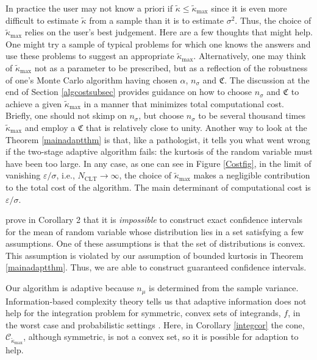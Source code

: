 \documentclass[graybox]{svmult}
\newcommand{\fudge}{\mathfrak{C}}
\newcommand{\tkappa}{\tilde{\kappa}}
\newcommand{\cc}{\mathcal{C}}
\begin{document}
In practice the user may not know a priori if $\tkappa \le \tkappa_{\max}$ since it is even more difficult to estimate $\tkappa$ from a sample than it is to estimate $\sigma^2$.  Thus, the choice of $\tkappa_{\max}$ relies on the user's best judgement.  Here are a few thoughts that might help.  One might try a sample of typical problems for which one knows the answers and use these problems to suggest an appropriate $\tkappa_{\max}$.  Alternatively, one may think of $\tkappa_{\max}$ not as a parameter to be prescribed, but as a reflection of the robustness of one's Monte Carlo algorithm having chosen $\alpha$, $n_\sigma$ and $\fudge$.  The discussion at the end of Section \ref{algcostsubsec} provides guidance on how to choose $n_\sigma$ and $\fudge$ to achieve a given $\tkappa_{\max}$ in a manner that minimizes total computational cost.  Briefly, one should not skimp on $n_\sigma$, but choose $n_\sigma$ to be several thousand times $\tkappa_{\max}$ and employ a $\fudge$ that is relatively close to unity.  Another way to look at the Theorem \ref{mainadaptthm} is that, like a pathologist, it tells you what went wrong if the two-stage adaptive algorithm fails: the kurtosis of the random variable must have been too large.
In any case, as one can see in Figure \ref{Costfig}, in the limit of vanishing $\varepsilon/\sigma$, i.e., $N_{\text{CLT}} \to \infty$, the choice of $\tkappa_{\max}$ makes a negligible contribution to the total cost of the algorithm.  The main determinant of computational cost is $\varepsilon/\sigma$.

\cite{BahSav56} prove in Corollary 2 that it is \emph{impossible} to construct exact confidence intervals for the mean of random variable whose distribution lies in a set satisfying a few assumptions. One of these assumptions is that the set of distributions is convex.  This assumption is violated by our assumption of bounded kurtosis in Theorem \ref{mainadaptthm}. Thus, we are able to construct guaranteed confidence intervals.

Our algorithm is adaptive because $n_\mu$ is determined from the sample variance.  Information-based complexity theory tells us that adaptive information does not help for the integration problem for symmetric, convex sets of integrands, $f$, in the worst case and probabilistic settings \citep[Chapter 4, Theorem 5.2.1; Chapter 8, Corollary 5.3.1]{TraWasWoz88}.  Here, in Corollary \ref{integcor} the cone, $\cc_{\tkappa_{\max}}$, although symmetric, is not a convex set, so it is possible for adaption to help.
\end{document}
